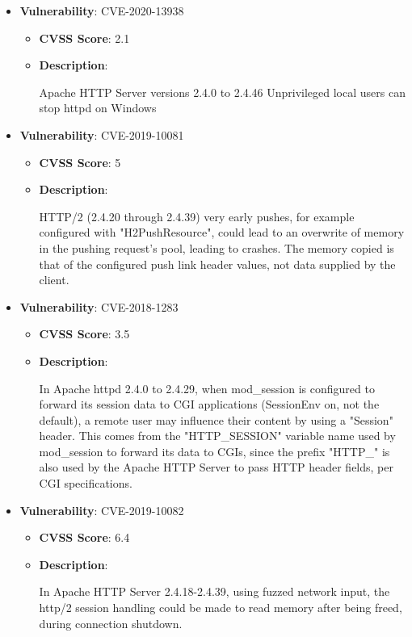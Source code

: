 \documentclass{article}
\begin{document}
\begin{itemize}
        \item \textbf{Vulnerability}: CVE-2020-13938
        \begin{itemize}
            \item \textbf{CVSS Score}:  2.1 
            \item \textbf{Description}:
            \parbox[t]{0.9\linewidth}{
                \ttfamily Apache HTTP Server versions 2.4.0 to 2.4.46 Unprivileged local users can stop httpd on Windows
            }
        \end{itemize}
    
        \item \textbf{Vulnerability}: CVE-2019-10081
        \begin{itemize}
            \item \textbf{CVSS Score}:  5 
            \item \textbf{Description}:
            \parbox[t]{0.9\linewidth}{
                \ttfamily HTTP/2 (2.4.20 through 2.4.39) very early pushes, for example configured with "H2PushResource", could lead to an overwrite of memory in the pushing request's pool, leading to crashes. The memory copied is that of the configured push link header values, not data supplied by the client.
            }
        \end{itemize}
    
        \item \textbf{Vulnerability}: CVE-2018-1283
        \begin{itemize}
            \item \textbf{CVSS Score}:  3.5 
            \item \textbf{Description}:
            \parbox[t]{0.9\linewidth}{
                \ttfamily In Apache httpd 2.4.0 to 2.4.29, when mod\_session is configured to forward its session data to CGI applications (SessionEnv on, not the default), a remote user may influence their content by using a "Session" header. This comes from the "HTTP\_SESSION" variable name used by mod\_session to forward its data to CGIs, since the prefix "HTTP\_" is also used by the Apache HTTP Server to pass HTTP header fields, per CGI specifications.
            }
        \end{itemize}
    
        \item \textbf{Vulnerability}: CVE-2019-10082
        \begin{itemize}
            \item \textbf{CVSS Score}:  6.4 
            \item \textbf{Description}:
            \parbox[t]{0.9\linewidth}{
                \ttfamily In Apache HTTP Server 2.4.18-2.4.39, using fuzzed network input, the http/2 session handling could be made to read memory after being freed, during connection shutdown.
            }
        \end{itemize}
    

\end{itemize}
\end{document}
